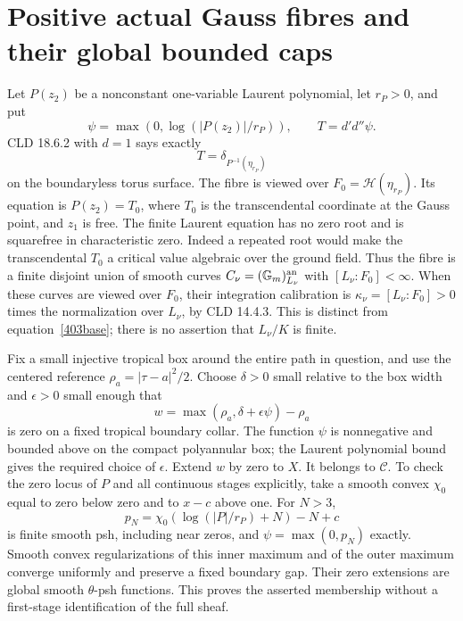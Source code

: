 \documentclass[11pt]{article}
\newcommand{\DD}{d'd''}
\newcommand{\C}{\mathcal C}
\newcommand{\HH}{\mathscr H}
\theoremstyle{remark}\newtheorem{remark}[theorem]{Remark}
\begin{document}
\section{Positive actual Gauss fibres and their global bounded caps}
Let $P(z_2)$ be a nonconstant one-variable Laurent polynomial,
let $r_P>0$, and put
\[
\psi=\max(0,\log(|P(z_2)|/r_P)),\qquad T=\DD\psi.
\]
CLD 18.6.2 with $d=1$ says exactly
\begin{equation}\label{403fibre}
T=\delta_{P^{-1}(\eta_{r_P})}
\end{equation}
on the boundaryless torus surface. The fibre is viewed over
$F_0=\HH(\eta_{r_P})$. Its equation is $P(z_2)=T_0$,
where $T_0$ is the transcendental coordinate at the Gauss
point, and $z_1$ is free. The finite Laurent equation has
no zero root and is squarefree in characteristic zero.
Indeed a repeated root would make the transcendental $T_0$
a critical value algebraic over the ground field. Thus the
fibre is a finite disjoint union of smooth curves
$C_\nu=(\mathbb G_m)^{\rm an}_{L_\nu}$ with
$[L_\nu:F_0]<\infty$. When these curves are viewed over
$F_0$, their integration calibration is
$\kappa_\nu=[L_\nu:F_0]>0$ times the normalization over
$L_\nu$, by CLD 14.4.3. This is distinct from
equation~\eqref{403base}; there is no assertion that
$L_\nu/K$ is finite.

Fix a small injective tropical box around the entire path
in question, and use the centered reference
$\rho_a=|\tau-a|^2/2$. Choose $\delta>0$ small relative to
the box width and $\epsilon>0$ small enough that
\[
w=\max(\rho_a,\delta+\epsilon\psi)-\rho_a
\]
is zero on a fixed tropical boundary collar. The function
$\psi$ is nonnegative and bounded above on the compact
polyannular box; the Laurent polynomial bound gives the
required choice of $\epsilon$. Extend $w$ by zero to $X$.
It belongs to $\C$. To check the zero locus of $P$ and all
continuous stages explicitly, take a smooth convex $\chi_0$
equal to zero below zero and to $x-c$ above one. For $N>3$,
\[
p_N=\chi_0(\log(|P|/r_P)+N)-N+c
\]
is finite smooth psh, including near zeros, and
$\psi=\max(0,p_N)$ exactly. Smooth convex regularizations
of this inner maximum and of the outer maximum converge
uniformly and preserve a fixed boundary gap. Their zero
extensions are global smooth $\theta$-psh functions.
This proves the asserted membership without a first-stage
identification of the full sheaf.
\end{document}
